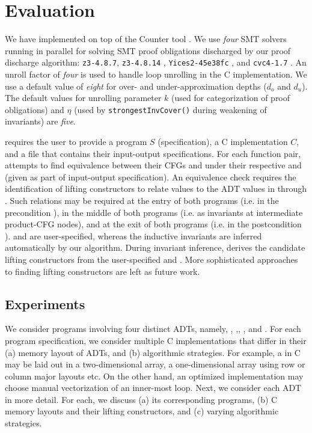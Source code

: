 \chapter{Evaluation}
\label{sec:eval}
\vspace{-10px}
We have implemented \toolName{} on top of the Counter tool \cite{oopsla20}.
We use {\em four} SMT solvers running in parallel for solving
SMT proof obligations discharged by our proof discharge algorithm:
{\tt z3-4.8.7}, {\tt z3-4.8.14} \cite{z3}, {\tt Yices2-45e38fc} \cite{yices}, and {\tt cvc4-1.7} \cite{cvc4solver}.
An unroll factor of {\em four} is used to handle loop unrolling in the C implementation.
We use a default value of {\em eight} for over- and under-approximation depths ($d_o$ and $d_u$).
The default values for unrolling parameter $k$ (used for categorization of proof obligations)
and $\eta$ (used by {\tt strongestInvCover()} during weakening of \recursiveRelation{} invariants) are {\em five}.

\toolName{} requires the user to provide a \SpecL{} program $S$ (specification), a C implementation $C$,
and a file that contains their input-output specifications.
For each function pair, \toolName{} attempts to find equivalence between their CFGs \sprog{} and \cprog{}
under their respective \pre{} and \post{} (given as part of input-output specification).
An equivalence check requires the identification of lifting constructors to relate \cprog{}
values to the ADT values in \sprog{} through  \recursiveRelations{}.
Such relations may be required at the entry of both programs (i.e. in the precondition \pre{}),
in the middle of both programs (i.e. as invariants at intermediate product-CFG nodes),
and at the exit of both programs (i.e. in the postcondition \post{}).
\pre{} and \post{} are user-specified, whereas the inductive invariants are
inferred automatically by our algorithm.
During invariant inference, \toolName{} derives the candidate lifting constructors
from the user-specified \pre{} and \post{}.
More sophisticated approaches to finding lifting constructors are left as future work.

\section{Experiments}
\label{sec:experiments}
\vspace{-5px}
We consider programs involving four distinct ADTs, namely,
 ,  ,,  ,
and  .
For each \SpecL{} program specification, we consider multiple
C implementations that differ in their (a) memory layout of ADTs, and
(b) algorithmic strategies. For example, a  in C may be laid out
in a two-dimensional array, a one-dimensional array using row or column major
layouts etc. On the other hand, an optimized implementation may choose manual vectorization
of an inner-most loop. Next, we consider each ADT in more detail. For each,
we discuss (a) its corresponding programs, (b) C memory layouts and their lifting
constructors, and (c) varying algorithmic strategies.

\vspace{-5px}
